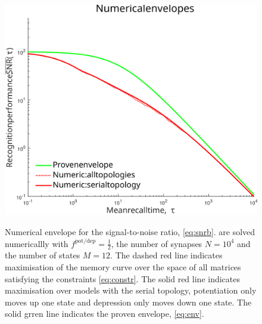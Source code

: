 \documentclass[12pt]{article}
\newcommand{\potdep}{^{\text{pot/dep}}}
\begin{document}
\begin{figure}[tb]
  \centering
  \includegraphics[width=0.8\linewidth]{LenvNum.svg}\\
  \caption[Numerical envelope for the signal-to-noise ratio]
  {Numerical envelope for the signal-to-noise ratio, \eqref{eq:snrb}. 
   are solved numericallly with $f\potdep=\frac{1}{2}$, the number of synapses $N=10^4$ and the number of states $M=12$.
  The dashed red line indicates maximisation of the memory curve over the space of all matrices satisfying the constraints \eqref{eq:constr}.
  The solid red line indicates maximisation over models with the serial topology, \ie potentiation only moves up one state and depression only moves down one state.
  The solid grren line indicates the proven envelope, \eqref{eq:env}.}\label{fig:envnum}
\end{figure}
\end{document}
